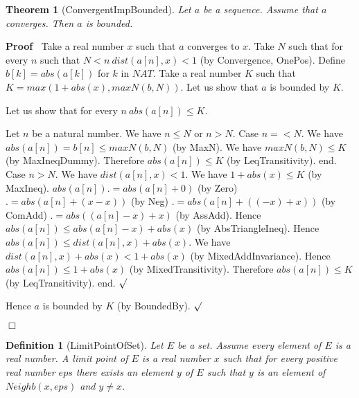 \documentclass{article}
\newenvironment{forthel}{\begin{leftbar}}{\end{leftbar}}
\newenvironment{proof}{\noindent\textbf{Proof\ }}{\hspace*{\fill}$\Box$\medskip}
\newenvironment{subproof}{\begin{list}{}{}
		\item[\text{Proof}]}{\hfill $\surd$ \end{list}}
\newtheorem{theorem}{Theorem}
\newtheorem{definition}{Definition}
\begin{document}
\begin{forthel}
	\begin{theorem} [ConvergentImpBounded]
	Let $a$ be a sequence. Assume that $a$ converges. Then $a$ is bounded.
	\end{theorem}
	\begin{proof}
	Take a real number $x$ such that $a$ converges to $x$.
	Take $N$ such that for every $n$ such that $N < n \ dist(a[n],x) < 1$ (by Convergence, OnePos).
	Define $b[k] = abs(a[k])$ for $k$ in $NAT$.
	Take a real number $K$ such that $K = max(1 + abs(x), maxN(b,N))$.
	Let us show that $a$ is bounded by $K$.
	\begin{subproof}
	Let us show that for every $n \ abs(a[n]) \leq K$.
	\begin{subproof} 
	Let $n$ be a natural number.
	We have $n \leq N$ or $n > N$.
	Case $n =< N$.
	We have $abs(a[n]) = b[n] \leq maxN(b,N)$ (by MaxN).
	We have $maxN(b,N) \leq K$ (by MaxIneqDummy).
	Therefore $abs(a[n]) \leq K$ (by LeqTransitivity).
	end.
	Case $n > N$.
	We have $dist(a[n],x) < 1$.
	We have $1 + abs(x) \leq K$ (by MaxIneq).
	$abs(a[n]) .= abs(a[n] + 0)$ (by Zero)
	$.= abs(a[n] + (x - x))$ (by Neg)
	$.= abs(a[n] + ((-x) + x))$ (by ComAdd)
	$.= abs((a[n] - x) + x)$ (by AssAdd).
	Hence $abs(a[n]) \leq abs(a[n] - x) + abs(x)$ (by AbsTriangleIneq).
	Hence $abs(a[n]) \leq dist(a[n],x) + abs(x)$.
	We have $dist(a[n],x) + abs(x) < 1 + abs(x)$ (by MixedAddInvariance).
	Hence $abs(a[n]) \leq 1 + abs(x)$ (by MixedTransitivity).
	Therefore $abs(a[n]) \leq K$ (by LeqTransitivity).
	end.
	\end{subproof}
	Hence $a$ is bounded by $K$ (by BoundedBy).
	\end{subproof}
	\end{proof}
	
	\begin{definition} [LimitPointOfSet]
	Let $E$ be a set. Assume every element of $E$ is a real number. A limit point of $E$
	is a real number $x$ such that for every positive real number $eps$ there exists an element
	$y$ of $E$ such that $y$ is an element of $Neighb(x,eps)$ and $y \neq x$.
	\end{definition}
	

\end{forthel}
\end{document}
